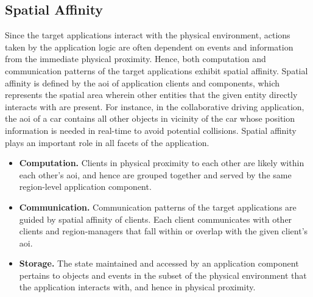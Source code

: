 \subsection{Spatial Affinity}
\label{sec:spatial_affinity}
Since the target applications interact with the physical environment, actions taken by the application logic are often dependent on events and information from the immediate physical proximity. Hence, both computation and communication patterns of the target applications exhibit spatial affinity. Spatial affinity is defined by the \gls{aoi} of application clients and components, which represents the spatial area wherein other entities that the given entity directly interacts with are present. For instance, in the collaborative driving application, the \gls{aoi} of a car contains all other objects in vicinity of the car whose position information is needed in real-time to avoid potential collisions. Spatial affinity plays an important role in all facets of the application.
\begin{itemize}
\item \textbf{Computation. }Clients in physical proximity to each other are likely within each other's \gls{aoi}, and hence are grouped together and served by the same region-level application component. 
\item \textbf{Communication. } Communication patterns of the target applications are guided by spatial affinity of clients. Each client communicates with other clients and region-managers that fall within or overlap with the given client's \gls{aoi}. 
\item \textbf{Storage. }The state maintained and accessed by an application component pertains to objects and events in the subset of the physical environment that the application interacts with, and hence in physical proximity.
\end{itemize}

